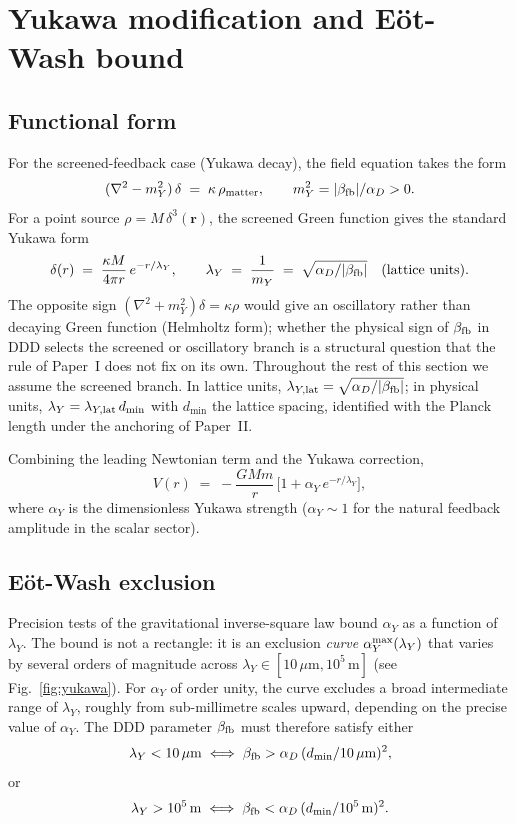 \documentclass[11pt,a4paper]{article}
\begin{document}
\section{Yukawa modification and Eöt-Wash bound}
\label{sec:yukawa}

\subsection{Functional form}

For the screened-feedback case (Yukawa decay), the field equation
takes the form
\[
(\nabla^2 - m_Y^2)\,\delta \;=\; \kappa\, \rho_{\rm matter},
\qquad m_Y^2 = |\beta_{\rm fb}|/\alpha_D > 0.
\]
For a point source $\rho = M\,\delta^3(\mathbf{r})$, the screened
Green function gives the standard Yukawa form
\[
\delta(r) \;=\; \frac{\kappa M}{4\pi r}\, e^{-r/\lambda_Y},
\qquad
\lambda_Y \;=\; \frac{1}{m_Y} \;=\; \sqrt{\alpha_D/|\beta_{\rm fb}|}
\quad \text{(lattice units)}.
\]
The opposite sign $(\nabla^2 + m_Y^2)\delta = \kappa\rho$ would
give an oscillatory rather than decaying Green function (Helmholtz
form); whether the physical sign of $\beta_{\rm fb}$ in DDD selects
the screened or oscillatory branch is a structural question that
the rule of Paper~I does not fix on its own. Throughout the rest
of this section we assume the screened branch.
In lattice units, $\lambda_{Y,{\rm lat}} = \sqrt{\alpha_D / |\beta_{\rm fb}|}$;
in physical units, $\lambda_Y = \lambda_{Y,{\rm lat}}\, d_{\min}$ with
$d_{\min}$ the lattice spacing, identified with the Planck length under
the anchoring of Paper~II.

Combining the leading Newtonian term and the Yukawa correction,
\[
V(r) \;=\; -\frac{GM m}{r}\,\big[1 + \alpha_Y\, e^{-r/\lambda_Y}\big],
\]
where $\alpha_Y$ is the dimensionless Yukawa strength
($\alpha_Y \sim 1$ for the natural feedback amplitude in the scalar
sector).

\subsection{E\"{o}t-Wash exclusion}

Precision tests of the gravitational inverse-square law
\cite{adelberger2003,kapner2007} bound $\alpha_Y$ as a function of
$\lambda_Y$. The bound is not a rectangle: it is an exclusion
\emph{curve} $\alpha_Y^{\rm max}(\lambda_Y)$ that varies by several
orders of magnitude across $\lambda_Y \in [10\,\mu\text{m},
10^5\,\text{m}]$ (see Fig.~\ref{fig:yukawa}). For $\alpha_Y$ of
order unity, the curve excludes a broad intermediate range of
$\lambda_Y$, roughly from sub-millimetre scales upward, depending on
the precise value of $\alpha_Y$. The DDD parameter $\beta_{\rm fb}$ must therefore satisfy
either
\[
\lambda_Y < 10\,\mu\text{m}
\;\Longleftrightarrow\;
\beta_{\rm fb} > \alpha_D\,(d_{\min}/10\,\mu\text{m})^2,
\]
or
\[
\lambda_Y > 10^5\,\text{m}
\;\Longleftrightarrow\;
\beta_{\rm fb} < \alpha_D\,(d_{\min}/10^5\,\text{m})^2.
\]
\end{document}
